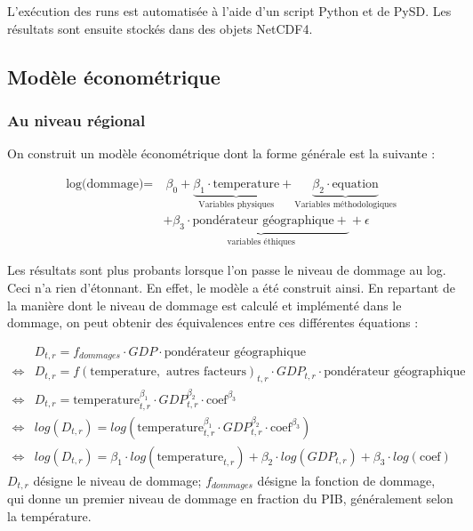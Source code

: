 \begin{methodbox}
L'exécution des runs est automatisée à l'aide d'un script Python et de PySD.  Les résultats sont ensuite stockés dans des objets NetCDF4. 

    
\end{methodbox}

\subsection{Modèle économétrique}

\subsubsection{Au niveau régional}


On construit un modèle économétrique dont la forme générale est la suivante : 


\begin{align}
\label{eq:modele}
    \text{log(dommage)} = & \ \beta_0  + \underbrace{\beta_1 \cdot \text{temperature}}_\text{Variables physiques}  + \underbrace{\beta_2 \cdot \text{equation}}_\text{Variables méthodologiques} \\
    & + \underbrace{ \beta_3 \cdot \text{pondérateur géographique} + }_\text{variables éthiques}  + \epsilon
    \end{align}


Les résultats sont plus probants lorsque l'on passe le niveau de dommage au log. Ceci n'a rien d'étonnant. En effet, le modèle a été construit ainsi. En repartant de la manière dont le niveau de dommage est calculé et implémenté dans le dommage, on peut obtenir des équivalences entre ces différentes équations : 

\begin{align*}
& D_{t,r} = f_{dommages} \cdot GDP \cdot \text{pondérateur géographique}\\
\iff & D_{t,r} = f(\text{temperature}, \text{ autres facteurs})_{t,r} \cdot GDP_{t,r} \cdot \text{pondérateur géographique} \\
\iff  & D_{t,r} = \text{temperature}_{t,r}^{\beta_1} \cdot GDP_{t,r}^{\beta_2} \cdot \text{coef}^{\beta_3} \\
\iff & log(D_{t,r}) = log(\text{temperature}_{t,r}^{\beta_1} \cdot GDP_{t,r}^{\beta_2} \cdot \text{coef}^{\beta_3}) \\
\iff & log(D_{t,r}) = \beta_1 \cdot log(\text{temperature}_{t,r}) + \beta_2 \cdot log(GDP_{t,r}) + \beta_3 \cdot log(\text{coef})
\end{align*}
$D_{t,r}$ désigne le niveau de dommage; $f_{dommages}$ désigne la fonction de dommage, qui donne un premier niveau de dommage en fraction du PIB, généralement selon la température.  \\

